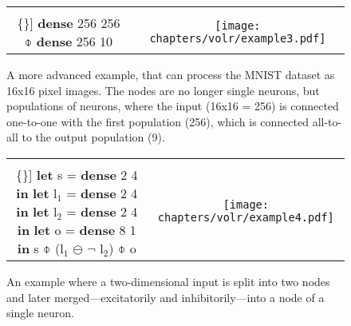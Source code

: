 \begin{figure}
  \ContinuedFloat
  \begin{tabular}[t]{c c}
    \begin{minipage}{0.4\textwidth}
      \begin{Verbatim}[mathescape,commandchars=\\\{\}]
\textbf{dense} 256 256 
  $\obar$ \textbf{dense} 256 10
      \end{Verbatim}
    \end{minipage} & \begin{minipage}{0.6\textwidth}
      \texttt{[image: chapters/volr/example3.pdf]}
    \end{minipage}
  \end{tabular}
  \caption{A more advanced example, that can process the MNIST dataset
    as 16x16 pixel images. 
    The nodes are no longer single neurons, but populations of neurons,
    where the input (16x16 = 256) is connected one-to-one
    with the first population (256), which is connected all-to-all to the 
    output population (9).}
\end{figure}

\begin{figure}
  \ContinuedFloat
  \begin{tabular}[t]{c c}
    \begin{minipage}{0.45\textwidth}
      \begin{Verbatim}[mathescape,commandchars=\\\{\}]
\textbf{let} s = \textbf{dense} 2 4 \textbf{in}
\textbf{let} l$_1$ = \textbf{dense} 2 4 \textbf{in}
\textbf{let} l$_2$ = \textbf{dense} 2 4 \textbf{in}
\textbf{let} o = \textbf{dense} 8 1 \textbf{in} 
  s $\obar$ (l$_1$ $\ominus$ $\neg$ l$_2$) $\obar$ o
      \end{Verbatim}
    \end{minipage} & \begin{minipage}{0.55\textwidth}
       \texttt{[image: chapters/volr/example4.pdf]}
    \end{minipage}
  \end{tabular}
   \caption{An example where a two-dimensional input is split into
     two nodes and later merged---excitatorily and inhibitorily---into 
     a node of a single neuron.}
  \label{fig:volr-example}
\end{figure}
